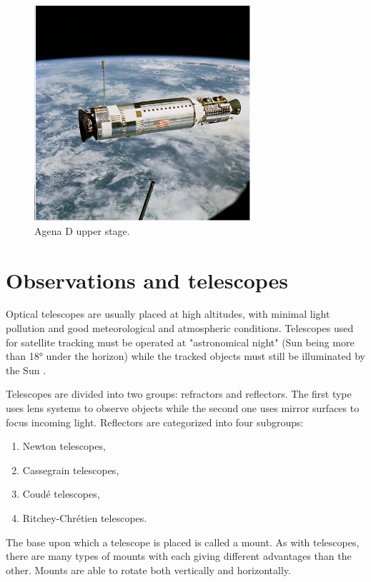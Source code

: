 \begin{figure}[H]
\centering
  \includegraphics[width=8cm]{images/upperstage}
  \caption{Agena D upper stage.}
  \label{fig:upperstage}
\end{figure}
	
\pagebreak


\section{Observations and telescopes}\label{sec:observations_telescopes}

Optical telescopes are usually placed at high altitudes, with minimal light pollution and good meteorological and atmospheric conditions. Telescopes used for satellite tracking must be operated at "astronomical night" (Sun being more than 18° under the horizon) while the tracked objects must still be illuminated by the Sun \citep{klinkrad2006space}.

	Telescopes are divided into two groups: refractors and reflectors. The first type uses lens systems to observe objects while the second one uses mirror surfaces to focus incoming light. Reflectors are categorized into four subgroups:
	
\begin{enumerate}
	\item Newton telescopes,
	\item Cassegrain telescopes,
	\item Coudé telescopes,
	\item Ritchey-Chrétien telescopes.
\end{enumerate}
	
	The base upon which a telescope is placed is called a mount. As with telescopes, there are many types of mounts with each giving different advantages than the other. Mounts are able to rotate both vertically and horizontally.
	
